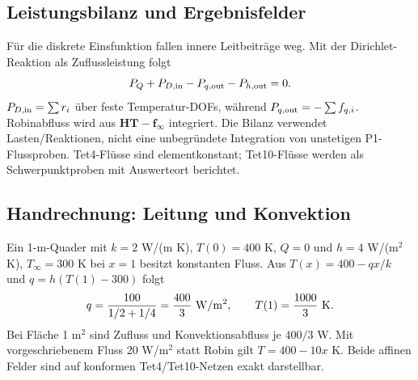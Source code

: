 \subsection{Leistungsbilanz und Ergebnisfelder}
Für die diskrete Einsfunktion fallen innere Leitbeiträge weg. Mit der
Dirichlet-Reaktion als Zuflussleistung folgt
\begin{equation}\label{eq:thermal-balance}
P_Q+P_{D,\rm in}-P_{q,\rm out}-P_{h,\rm out}=0.
\end{equation}
$P_{D,\rm in}=\sum r_i$ über feste Temperatur-DOFs, während
$P_{q,\rm out}=-\sum f_{q,i}$. Robinabfluss wird aus
$\mathbf H\mathbf T-\mathbf f_\infty$ integriert.
Die Bilanz verwendet Lasten/Reaktionen, nicht eine unbegründete Integration
von unstetigen P1-Flussproben. Tet4-Flüsse sind elementkonstant; Tet10-Flüsse
werden als Schwerpunktproben mit Auswerteort berichtet.

\subsection{Handrechnung: Leitung und Konvektion}
Ein 1-m-Quader mit $k=2$ W/(m K), $T(0)=400$ K, $Q=0$ und
$h=4$ W/(m$^2$ K), $T_\infty=300$ K bei $x=1$ besitzt konstanten Fluss.
Aus $T(x)=400-qx/k$ und $q=h(T(1)-300)$ folgt
\begin{equation}\label{eq:thermal-example}
q=\frac{100}{1/2+1/4}=\frac{400}{3}\ {\rm W/m^2},
\qquad T(1)=\frac{1000}{3}\ {\rm K}.
\end{equation}
Bei Fläche 1 m$^2$ sind Zufluss und Konvektionsabfluss je $400/3$ W.
Mit vorgeschriebenem Fluss 20 W/m$^2$ statt Robin gilt $T=400-10x$ K.
Beide affinen Felder sind auf konformen Tet4/Tet10-Netzen exakt darstellbar.

